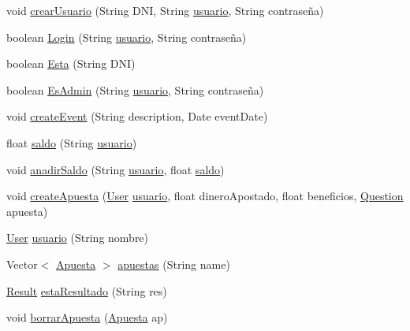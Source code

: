 \begin{DoxyCompactItemize}
void \mbox{\hyperlink{interfacebusinessLogic_1_1BLFacade_ad5ddf0ebb395d8d4d8574ccb9cc4047e}{crear\+Usuario}} (String D\+NI, String \mbox{\hyperlink{interfacebusinessLogic_1_1BLFacade_aeea4894fe11f25ad2b00531ebcb3fb4c}{usuario}}, String contraseña)
\item 
boolean \mbox{\hyperlink{interfacebusinessLogic_1_1BLFacade_adef077ad68e73cc18466c7f8805f1516}{Login}} (String \mbox{\hyperlink{interfacebusinessLogic_1_1BLFacade_aeea4894fe11f25ad2b00531ebcb3fb4c}{usuario}}, String contraseña)
\item 
boolean \mbox{\hyperlink{interfacebusinessLogic_1_1BLFacade_a6d1b585be500b872823e516cc30929ee}{Esta}} (String D\+NI)
\item 
boolean \mbox{\hyperlink{interfacebusinessLogic_1_1BLFacade_abd1601649b5bd94bd61c5c2a4893c734}{Es\+Admin}} (String \mbox{\hyperlink{interfacebusinessLogic_1_1BLFacade_aeea4894fe11f25ad2b00531ebcb3fb4c}{usuario}}, String contraseña)
\item 
void \mbox{\hyperlink{interfacebusinessLogic_1_1BLFacade_a8ff6dbaab4c3d5312c655bce4fedfff3}{create\+Event}} (String description, Date event\+Date)
\item 
float \mbox{\hyperlink{interfacebusinessLogic_1_1BLFacade_a1b91318bf144ed2eae0c38e385dfdd1f}{saldo}} (String \mbox{\hyperlink{interfacebusinessLogic_1_1BLFacade_aeea4894fe11f25ad2b00531ebcb3fb4c}{usuario}})
\item 
void \mbox{\hyperlink{interfacebusinessLogic_1_1BLFacade_a7327ebe6d1046c51d614553747d670f5}{anadir\+Saldo}} (String \mbox{\hyperlink{interfacebusinessLogic_1_1BLFacade_aeea4894fe11f25ad2b00531ebcb3fb4c}{usuario}}, float \mbox{\hyperlink{interfacebusinessLogic_1_1BLFacade_a1b91318bf144ed2eae0c38e385dfdd1f}{saldo}})
\item 
void \mbox{\hyperlink{interfacebusinessLogic_1_1BLFacade_a9656d5e373e849021e3b77ee4bb2ad65}{create\+Apuesta}} (\mbox{\hyperlink{classdomain_1_1User}{User}} \mbox{\hyperlink{interfacebusinessLogic_1_1BLFacade_aeea4894fe11f25ad2b00531ebcb3fb4c}{usuario}}, float dinero\+Apostado, float beneficios, \mbox{\hyperlink{classdomain_1_1Question}{Question}} apuesta)
\item 
\mbox{\hyperlink{classdomain_1_1User}{User}} \mbox{\hyperlink{interfacebusinessLogic_1_1BLFacade_aeea4894fe11f25ad2b00531ebcb3fb4c}{usuario}} (String nombre)
\item 
Vector$<$ \mbox{\hyperlink{classdomain_1_1Apuesta}{Apuesta}} $>$ \mbox{\hyperlink{interfacebusinessLogic_1_1BLFacade_adfadb667916c0f312ad1794b052e0cbf}{apuestas}} (String name)
\item 
\mbox{\hyperlink{classdomain_1_1Result}{Result}} \mbox{\hyperlink{interfacebusinessLogic_1_1BLFacade_a3115bea528677d182ed5725eacbdf13c}{esta\+Resultado}} (String res)
\item 
void \mbox{\hyperlink{interfacebusinessLogic_1_1BLFacade_ab30f9458b5169fda3e5bead92dcf3f84}{borrar\+Apuesta}} (\mbox{\hyperlink{classdomain_1_1Apuesta}{Apuesta}} ap)
\end{DoxyCompactItemize}


